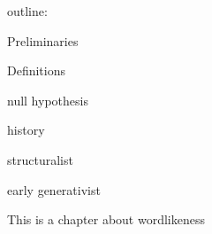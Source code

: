 outline:

Preliminaries

Definitions

null hypothesis

history

structuralist

early generativist



This is a chapter about wordlikeness
